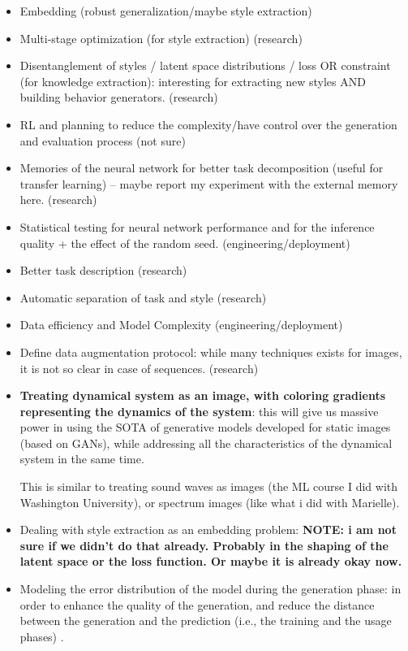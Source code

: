 \begin{itemize}
    \item Embedding (robust generalization/maybe style extraction)
    \item Multi-stage optimization (for style extraction) (research)
    \item Disentanglement of styles / latent space distributions / loss OR constraint (for knowledge extraction): interesting for extracting new styles AND building behavior generators. (research)
    \item RL and planning to reduce the complexity/have control over the generation and evaluation process (not sure)
    \item Memories of the neural network for better task decomposition (useful for transfer learning) -- maybe report my experiment with the external memory here. (research)
    \item Statistical testing for neural network performance and for the inference quality + the effect of the random seed. (engineering/deployment)
    \item Better task description (research)
    \item Automatic separation of task and style (research)
    \item Data efficiency and Model Complexity (engineering/deployment)
    \item Define data augmentation protocol: while many techniques exists for images, it is not so clear in case of sequences. (research)
    \item \textbf{Treating dynamical system as an image, with coloring gradients representing the dynamics of the system}: this will give us massive power in using the SOTA of generative models developed for static images (based on GANs), while addressing all the characteristics of the dynamical system in the same time.

    This is similar to treating sound waves as images (the ML course I did with Washington University), or spectrum images (like what i did with Marielle).

    \item Dealing with style extraction as an embedding problem: \textbf{NOTE: i am not sure if we didn't do that already. Probably in the shaping of the latent space or the loss function. Or maybe it is already okay now. }

    \item Modeling the error distribution of the model during the generation phase: in order to enhance the quality of the generation, and reduce the distance between the generation and the prediction (i.e., the training and the usage phases) .


\end{itemize}
